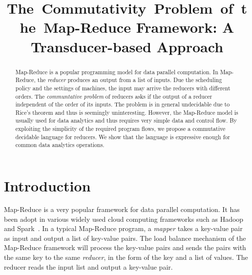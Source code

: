 \documentclass[runningheads,a4paper]{llncs}
\title{The~Commutativity~Problem~of~the~Map-Reduce Framework: A Transducer-based Approach}
\author{}
\institute{}
\begin{document}
\maketitle

\begin{abstract}

Map-Reduce is a popular programming model for data parallel computation. 
In Map-Reduce, the \emph{reducer} produces an output from a list of inputs. Due the scheduling policy and the settings of machines, the input may arrive the reducers with different orders. The \emph{communtative problem} of reducers asks if the output of a reducer independent of the order of its inputs. The problem is in general undecidable due to Rice's theorem and thus is seemingly uninteresting. However, the Map-Reduce model is usually used for data analytics and thus requires very simple data and control flow. 
By exploiting the simplicity of the required program flows, we propose a commutative decidable language for reducers.
We show that the language is expressive enough for common data analytics operations.
\end{abstract}

\section{Introduction}
Map-Reduce is a very popular framework for data parallel computation. It has been adopt in various widely used cloud computing frameworks such as Hadoop~\cite{Hadoop} and Spark~\cite{Spark}. In a typical Map-Reduce program, a \emph{mapper} takes a key-value pair as input and output a list of key-value pairs. The load balance mechanism of the Map-Reduce framework will process the key-value pairs and sends the pairs with the same key to the same \emph{reducer}, in the form of the key and a list of values. The reducer reads the input list and output a key-value pair.






\end{document}
